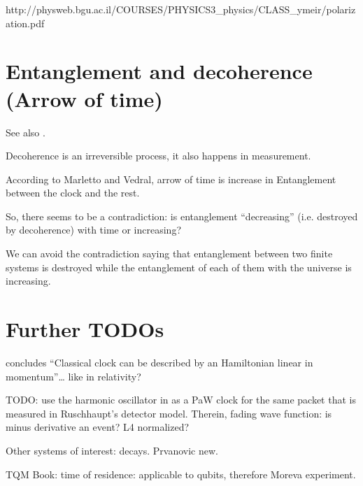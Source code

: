 http://physweb.bgu.ac.il/COURSES/PHYSICS3_physics/CLASS_ymeir/polarization.pdf

\section{Entanglement and decoherence (Arrow of time)}
See also \cite{EntanglementVsDecoherence}.

Decoherence is an irreversible process, it also happens in measurement.

According to Marletto and Vedral, arrow of time is increase in Entanglement
between the clock and the rest.

So, there seems to be a contradiction: is entanglement ``decreasing''
(i.e. destroyed by decoherence) with time
or increasing?

We can avoid the contradiction saying that
entanglement between two finite systems is
destroyed while the entanglement of each of them with the universe
is increasing.

\fi

\iftodo
\section{Further TODOs}

\cite{HarmonicClocks} concludes ``Classical clock can be described by an Hamiltonian linear in momentum''\dots
like in relativity?

TODO: use the harmonic oscillator in \cite{HarmonicClocks}
as a PaW clock for the same packet that is measured in
Ruschhaupt's detector model.
Therein, fading wave function: is minus derivative an event?
L4 normalized?

Other systems of interest: decays. Prvanovic new.

TQM Book: time of residence: applicable to qubits, therefore Moreva experiment.
\fi

